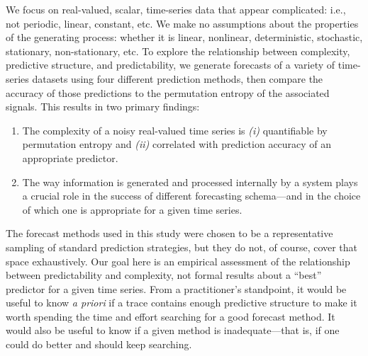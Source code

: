 We focus on real-valued, scalar, time-series data that appear
complicated: i.e., not periodic, linear, constant, etc.  We make no
assumptions about the properties of the generating process: whether it
is linear, nonlinear, deterministic, stochastic, stationary,
non-stationary, etc.
To explore the relationship between complexity, predictive structure,
and predictability, we generate forecasts of a variety of time-series
datasets using four different prediction methods, then compare the
accuracy of those predictions to the permutation entropy of the
associated signals.  This results in two primary findings:
\begin{enumerate}
\item The complexity of a noisy real-valued time series is {\sl (i)}
  quantifiable by permutation entropy and {\sl (ii)} correlated with prediction
  accuracy of an appropriate predictor.
\item The way information is generated and processed internally by a
  system plays a crucial role in the success of different forecasting
  schema---and in the choice of which one is appropriate for a given 
time series.
\end{enumerate}
The forecast methods used in this study were chosen to be a
representative sampling of standard prediction strategies, but they do
not, of course, cover that space exhaustively.  Our goal here is an
empirical assessment of the relationship between predictability and
complexity, not formal results about a ``best'' predictor for a given
time series.  From a practitioner's standpoint, it would be useful to
know {\sl a priori} if a trace contains enough predictive structure to
make it worth spending the time and effort searching for a good
forecast method.  It would also be useful to know if a given method is
inadequate---that is, if one could do better and should keep
searching.


